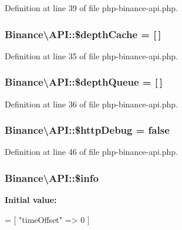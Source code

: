 Definition at line 39 of file php-\/binance-\/api.\-php.

\hypertarget{classBinance_1_1API_a69d62e886266a59b0a314cb4f5f164ca}{
\subsubsection[{\$depth\-Cache}]{\setlength{\rightskip}{0pt plus 5cm}Binance\textbackslash{}\-A\-P\-I\-::\$depth\-Cache = \mbox{[}$\,$\mbox{]}\hspace{0.3cm}{\ttfamily [protected]}}}\label{classBinance_1_1API_a69d62e886266a59b0a314cb4f5f164ca}


Definition at line 35 of file php-\/binance-\/api.\-php.

\hypertarget{classBinance_1_1API_ab04600479e07a4af0ead9ba84772bde1}{
\subsubsection[{\$depth\-Queue}]{\setlength{\rightskip}{0pt plus 5cm}Binance\textbackslash{}\-A\-P\-I\-::\$depth\-Queue = \mbox{[}$\,$\mbox{]}\hspace{0.3cm}{\ttfamily [protected]}}}\label{classBinance_1_1API_ab04600479e07a4af0ead9ba84772bde1}


Definition at line 36 of file php-\/binance-\/api.\-php.

\hypertarget{classBinance_1_1API_aaaf9a901342001f8734bfab6ba505205}{
\subsubsection[{\$http\-Debug}]{\setlength{\rightskip}{0pt plus 5cm}Binance\textbackslash{}\-A\-P\-I\-::\$http\-Debug = false}}\label{classBinance_1_1API_aaaf9a901342001f8734bfab6ba505205}


Definition at line 46 of file php-\/binance-\/api.\-php.

\hypertarget{classBinance_1_1API_a8d15ac7cb74ac52f8f008e61aa7cab89}{
\subsubsection[{\$info}]{\setlength{\rightskip}{0pt plus 5cm}Binance\textbackslash{}\-A\-P\-I\-::\$info\hspace{0.3cm}{\ttfamily [protected]}}}\label{classBinance_1_1API_a8d15ac7cb74ac52f8f008e61aa7cab89}
{\bfseries Initial value\-:}
\begin{DoxyCode}
= [ 
         \textcolor{stringliteral}{"timeOffset"} => 0 
   ]
\end{DoxyCode}


